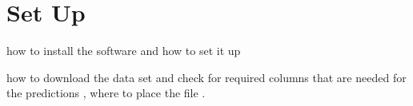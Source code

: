 %
%

\chapter{Set Up}

how to install the software and how to set it up 

how to download the data set and check for required columns that are needed for the predictions , where to place the file .
